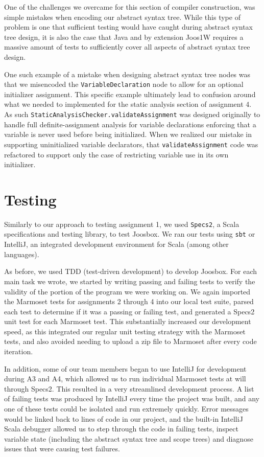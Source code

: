 \documentclass[letterpaper]{article}
\begin{document}
  One of the challenges we overcame for this section of compiler construction,
  was simple mistakes when encoding our abstract syntax tree. While this type of
  problem is one that sufficient testing would have caught during abstract
  syntax tree design, it is also the case that Java and by extension Joos1W
  requires a massive amount of tests to sufficiently cover all aspects of
  abstract syntax tree design.

  One such example of a mistake when designing abstract syntax tree nodes was
  that we misencoded the {\tt VariableDeclaration} node to allow for an optional
  initializer assignment. This specific example ultimately lead to confusion
  around what we needed to implemented for the static analysis section of
  assignment 4. As such {\tt StaticAnalysisChecker.validateAssignment}
  was designed originally to handle full definite-assignment analysis for
  variable declarations enforcing that a variable is never used before being
  initialized. When we realized our mistake in supporting uninitialized variable
  declarators, that {\tt validateAssignment} code was refactored to support only
  the case of restricting variable use in its own initializer.

  \section{Testing}

  Similarly to our approach to testing assignment 1, we used {\tt Specs2}, a
  Scala specifications and testing library, to test Joosbox. We ran our tests
  using {\tt sbt} or IntelliJ, an integrated development environment for Scala
  (among other languages).

  As before, we used TDD (test-driven development) to develop Joosbox. For
  each main task we wrote, we started by writing passing and failing tests to
  verify the validity of the portion of the program we were working on. We
  again imported the Marmoset tests for assignments 2 through 4 into our local
  test suite, parsed each test to determine if it was a passing or failing
  test, and generated a Specs2 unit test for each Marmoset test. This
  substantially increased our development speed, as this integrated our
  regular unit testing strategy with the Marmoset tests, and also avoided
  needing to upload a zip file to Marmoset after every code iteration.

  In addition, some of our team members began to use IntelliJ for development
  during A3 and A4, which allowed us to run individual Marmoset tests at will
  through Specs2. This resulted in a very streamlined development process. A
  list of failing tests was produced by IntelliJ every time the project was
  built, and any one of these tests could be isolated and run extremely
  quickly. Error messages would be linked back to lines of code in our
  project, and the built-in IntelliJ Scala debugger allowed us to step through
  the code in failing tests, inspect variable state (including the abstract
  syntax tree and scope trees) and diagnose issues that were causing test
  failures.
\end{document}
